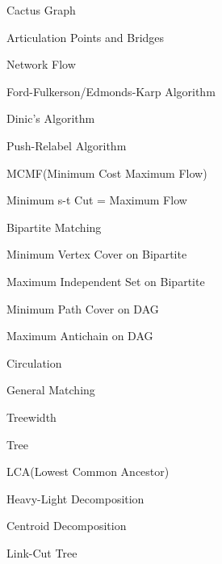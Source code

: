 \documentclass[portrait, 8pt, a4paper, oneside, twocolumn]{extarticle}
\begin{document}
\begin{tcolorbox}[breakable, enhanced, sharp corners, colback=white, colframe=black, boxrule=1pt, left=0pt]
\begin{IdeaNote}
\begin{IdeaNote}
\begin{IdeaNote}
\begin{IdeaNote}
            \item Cactus Graph
            \end{IdeaNote}
        \item Articulation Points and Bridges
        \end{IdeaNote}
    \item Network Flow
        \begin{IdeaNote}
        \item Ford-Fulkerson/Edmonds-Karp Algorithm
        \item Dinic's Algorithm
        \item Push-Relabel Algorithm
        \item MCMF(Minimum Cost Maximum Flow)
        \item Minimum s-t Cut = Maximum Flow
        \item Bipartite Matching
            \begin{IdeaNote}
            \item Minimum Vertex Cover on Bipartite
            \item Maximum Independent Set on Bipartite
            \item Minimum Path Cover on DAG
            \item Maximum Antichain on DAG
            \end{IdeaNote}
        \item Circulation
        \item General Matching
        \end{IdeaNote}
    \item Treewidth
    \end{IdeaNote}
        
\item Tree
    \begin{IdeaNote}
    \item LCA(Lowest Common Ancestor)
    \item Heavy-Light Decomposition
    \item Centroid Decomposition
    \item Link-Cut Tree
    \end{IdeaNote}


\end{IdeaNote}
\end{tcolorbox}
\end{document}
